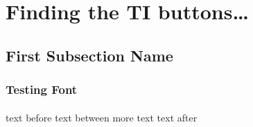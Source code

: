 \section{Finding the TI buttons\ldots}

\subsection[Short First Subsection Name]{First Subsection Name}

\begin{frame}
\frametitle{Testing Font}
\framesubtitle{}

% 
% 
% 

text before
\tiLOne\tiLOne text between
more text
text after

\end{frame}


